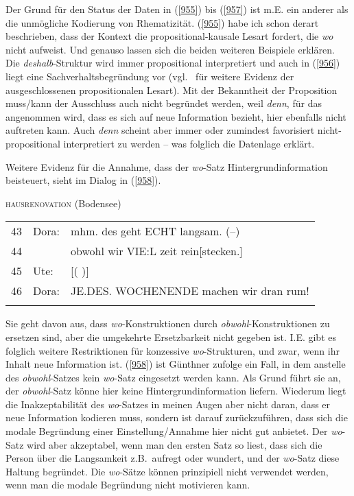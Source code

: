 {Der Grund für den Status der Daten in (\ref{955}) bis (\ref{957}) ist m.E. ein anderer als die unmögliche Kodierung von Rhematizität. (\ref{955}) habe ich schon derart beschrieben, dass der Kontext die propositional-kausale Lesart fordert, die \textit{wo} nicht aufweist. Und genauso lassen sich die beiden weiteren Beispiele erklären. Die \textit{deshalb}-Struktur wird immer propositional interpretiert und auch in (\ref{956}) liegt eine Sachverhaltsbegründung vor (vgl.\ \citealt[143]{Pasch1999} für weitere Evidenz der ausgeschlossenen propositionalen Lesart). Mit der Bekanntheit der Proposition muss/kann der Ausschluss auch nicht begründet werden, weil \textit{denn}, für das angenommen wird, dass es sich auf neue Information bezieht, hier ebenfalls nicht auftreten kann. Auch \textit{denn} scheint aber immer oder zumindest favorisiert nicht-propositional interpretiert zu werden – was folglich die Datenlage erklärt.

Weitere Evidenz für die Annahme, dass der \textit{wo}-Satz Hintergrundinformation beisteuert, sieht \citet{Guenthner2002} im Dialog in (\ref{958}).

\begin{exe}
	\ex\label{958} \textsc{hausrenovation} (Bodensee)\\
	\begin{tabularx}{\linewidth}[t]{@{}llX@{}}
	43 & Dora:& mhm. des geht ECHT langsam. (–)\\
	44 &      &obwohl wir VIE:L zeit rein[stecken.]\\
	45 & Ute: & \hspace{5cm} [(           )]\\
	46 & Dora:& JE.DES. WOCHENENDE machen wir dran rum! \\
	& & \hfill\hbox{\citet[331]{Guenthner2002}}
	\end{tabularx}
\end{exe}
Sie geht davon aus, dass \textit{wo}-Konstruktionen durch \textit{obwohl}-Konstruktionen zu ersetzen sind, aber die umgekehrte Ersetzbarkeit nicht gegeben ist. I.E. gibt es folg\-lich weitere Restriktionen für konzessive \textit{wo}-Strukturen, und zwar, wenn ihr Inhalt neue Information ist. (\ref{958}) ist Günthner zufolge ein Fall, in dem anstelle des \textit{obwohl}-Satzes kein \textit{wo}-Satz eingesetzt werden kann. Als Grund führt sie an, der \textit{obwohl}-Satz könne hier keine Hintergrundinformation liefern. Wiederum liegt die Inakzeptabilität des \textit{wo}-Satzes in meinen Augen aber nicht daran, dass er neue Information kodieren muss, sondern ist darauf zurückzuführen, dass sich die modale Begründung einer Einstellung/Annahme hier nicht gut anbietet. Der \textit{wo}-Satz wird aber akzeptabel, wenn man den ersten Satz so liest, dass sich die Person über die Langsamkeit z.B.\ aufregt oder wundert, und der \textit{wo}-Satz diese Haltung begründet. Die  \textit{wo}-Sätze können prinzipiell nicht verwendet werden, wenn man die modale Begründung nicht motivieren kann.

}
